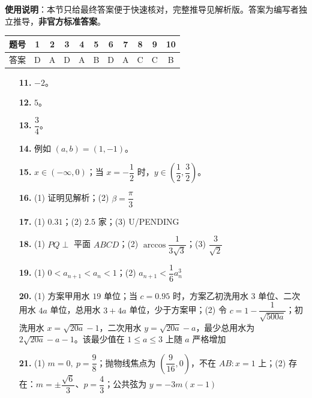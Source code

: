 
\begin{gknotice}
\textbf{使用说明}：本节只给最终答案便于快速核对，完整推导见解析版。答案为编写者独立推导，\textbf{非官方标准答案}。
\end{gknotice}

\begin{center}\begin{tabular}{ccccccccccc}
\toprule
题号 & 1 & 2 & 3 & 4 & 5 & 6 & 7 & 8 & 9 & 10 \\
\midrule
答案 & D & A & D & A & B & D & A & C & C & B \\
\bottomrule
\end{tabular}\end{center}

\begin{itemize}[leftmargin=2.6em]
  \item[\textbf{11.}] $-2$。
  \item[\textbf{12.}] $5$。
  \item[\textbf{13.}] $\dfrac34$。
  \item[\textbf{14.}] 例如 $(a,b)=(1,-1)$。
  \item[\textbf{15.}] $x\in(-\infty,0)$；当 $x=-\dfrac12$ 时，$y\in\left(\dfrac12,\dfrac32\right)$。
\end{itemize}

\begin{itemize}[leftmargin=2.6em]
  \item[\textbf{16.}] (1) 证明见解析；(2) $\beta=\dfrac\pi3$
  \item[\textbf{17.}] (1) $0.31$；(2) $2.5$ 家；(3) U/PENDING
  \item[\textbf{18.}] (1) $PQ\perp$ 平面 $ABCD$；(2) $\arccos\dfrac1{3\sqrt3}$；(3) $\dfrac3{\sqrt2}$
  \item[\textbf{19.}] (1) $0<a_{n+1}<a_n<1$；(2) $a_{n+1}<\dfrac16a_n^3$
  \item[\textbf{20.}] (1) 方案甲用水 $19$ 单位；当 $c=0.95$ 时，方案乙初洗用水 $3$ 单位、二次用水 $4a$ 单位，总用水 $3+4a$ 单位，少于方案甲；(2) 令 $c=1-\dfrac1{\sqrt{500a}}$；初洗用水 $x=\sqrt{20a}-1$，二次用水 $y=\sqrt{20a}-a$，最少总用水为 $2\sqrt{20a}-a-1$。该最少值在 $1\le a\le3$ 上随 $a$ 严格增加
  \item[\textbf{21.}] (1) $m=0,\ p=\dfrac98$；抛物线焦点为 $\left(\dfrac9{16},0\right)$，不在 $AB:x=1$ 上；(2) 存在：$m=\pm\dfrac{\sqrt6}3$、$p=\dfrac43$；公共弦为 $y=-3m(x-1)$
\end{itemize}
